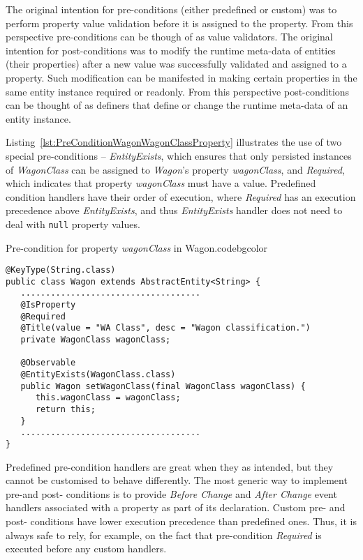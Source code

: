   The original intention for pre-conditions (either predefined or custom) was to perform property value validation before it is assigned to the property.
  From this perspective pre-conditions can be though of as value validators.
  The original intention for post-conditions was to modify the runtime meta-data of entities (their properties) after a new value was successfully validated and assigned to a property.
  Such modification can be manifested in making certain properties in the same entity instance required or readonly.
  From this perspective post-conditions can be thought of as definers that define or change the runtime meta-data of an entity instance.
  
  Listing~\ref{lst:PreConditionWagonWagonClassProperty} illustrates the use of two special pre-conditions -- \emph{EntityExists}, which ensures that only persisted instances of \emph{WagonClass} can be assigned to \emph{Wagon}'s property \emph{wagonClass}, and \emph{Required}, which indicates that property \emph{wagonClass} must have a value.
  Predefined condition handlers have their order of execution, where \emph{Required} has an execution precedence above \emph{EntityExists}, and thus \emph{EntityExists} handler does not need to deal with \texttt{null} property values.

  \begin{code}{Pre-condition for property \emph{wagonClass} in Wagon.}{\label{lst:PreConditionWagonWagonClassProperty}}{codebgcolor}
    \begin{lstlisting}
@KeyType(String.class)
public class Wagon extends AbstractEntity<String> {  
   ....................................
   @IsProperty
   @Required
   @Title(value = "WA Class", desc = "Wagon classification.")
   private WagonClass wagonClass;

   @Observable
   @EntityExists(WagonClass.class)
   public Wagon setWagonClass(final WagonClass wagonClass) {
      this.wagonClass = wagonClass;
      return this;
   }
   ....................................
}
    \end{lstlisting}
  \end{code}

  Predefined pre-condition handlers are great when they as intended, but they cannot be customised to behave differently.
  The most generic way to implement pre-and post- conditions is to provide \emph{Before Change} and \emph{After Change} event handlers associated with a property as part of its declaration.
  Custom pre- and post- conditions have lower execution precedence than predefined ones.  
  Thus, it is always safe to rely, for example, on the fact that pre-condition \emph{Required} is executed before any custom handlers.

